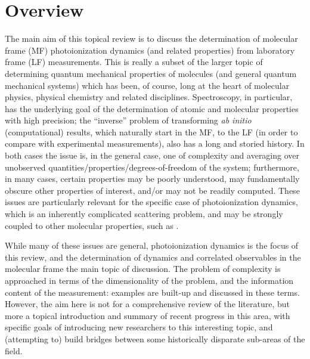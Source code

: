 \section{Overview}
The main aim of this topical review is to discuss the determination of molecular frame (MF) photoionization dynamics (and related properties) from laboratory frame (LF) measurements. This is really a subset of the larger topic of determining quantum mechanical properties of molecules (and general quantum mechanical systems) which has been, of course, long at the heart of molecular physics, physical chemistry and related disciplines. Spectroscopy, in particular, has the underlying goal of the determination of atomic and molecular properties with high precision; the “inverse” problem of transforming \textit{ab initio} (computational) results, which naturally start in the MF, to the LF (in order to compare with experimental measurements), also has a long and storied history. In both cases the issue is, in the general case, one of complexity and averaging over unobserved quantities/properties/degrees-of-freedom of the system; furthermore, in many cases, certain properties may be poorly understood, may fundamentally obscure other properties of interest, and/or may not be readily computed. These issues are particularly relevant for the specific case of photoionization dynamics, which is an inherently complicated scattering problem, and may be strongly coupled to other molecular properties, such as . 

While many of these issues are general, photoionization dynamics is the focus of this review, and the determination of dynamics and correlated observables in the molecular frame the main topic of discussion. The problem of complexity is approached in terms of the dimensionality of the problem, and the information content of the measurement: examples are built-up and discussed in these terms. However, the aim here is not for a comprehensive review of the literature, but more a topical introduction and summary of recent progress in this area, with specific goals of introducing new researchers to this interesting topic, and (attempting to) build bridges between some historically disparate sub-areas of the field.